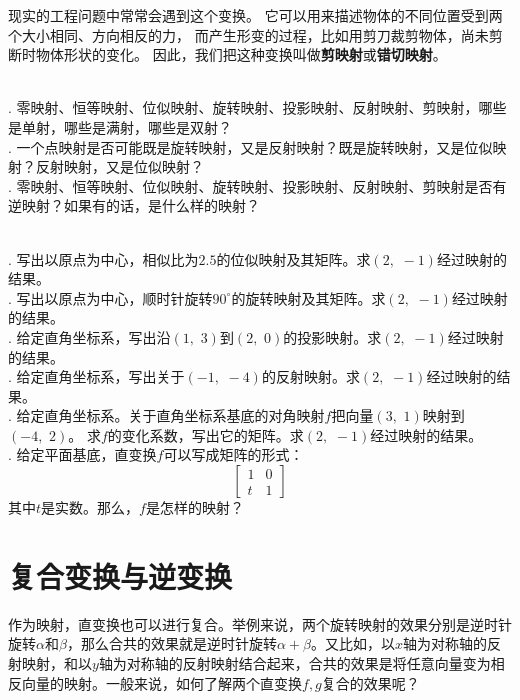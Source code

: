 \documentclass[12pt,UTF8,fontset=none]{ctexbook}
\begin{document}
现实的工程问题中常常会遇到这个变换。
它可以用来描述物体的不同位置受到两个大小相同、方向相反的力，
而产生形变的过程，比如用剪刀裁剪物体，尚未剪断时物体形状的变化。
因此，我们把这种变换叫做\textbf{剪映射}或\textbf{错切映射}。


\begin{sk}
    \mbox{} \\
    . 零映射、恒等映射、位似映射、旋转映射、投影映射、反射映射、剪映射，哪些是单射，哪些是满射，哪些是双射？\\
    . 一个点映射是否可能既是旋转映射，又是反射映射？既是旋转映射，又是位似映射？反射映射，又是位似映射？\\
    . 零映射、恒等映射、位似映射、旋转映射、投影映射、反射映射、剪映射是否有逆映射？如果有的话，是什么样的映射？
\end{sk}

\begin{xt}
    \mbox{} \\
    . 写出以原点为中心，相似比为$2.5$的位似映射及其矩阵。求$(2,\,\,-1)$经过映射的结果。\\
    . 写出以原点为中心，顺时针旋转$90^\circ$的旋转映射及其矩阵。求$(2,\,\,-1)$经过映射的结果。\\
    . 给定直角坐标系，写出沿$(1,\,\,3)$到$(2,\,\,0)$的投影映射。求$(2,\,\,-1)$经过映射的结果。\\
    . 给定直角坐标系，写出关于$(-1,\,\,-4)$的反射映射。求$(2,\,\,-1)$经过映射的结果。\\
    . 给定直角坐标系。关于直角坐标系基底的对角映射$f$把向量$(3,\,\,1)$映射到$(-4,\,\,2)$。
               求$f$的变化系数，写出它的矩阵。求$(2,\,\,-1)$经过映射的结果。\\
    . 给定平面基底，直变换$f$可以写成矩阵的形式：
                $$
                \begin{bmatrix}
                    1 & 0 \\ t & 1
                \end{bmatrix}
                $$
                其中$t$是实数。那么，$f$是怎样的映射？
\end{xt}

\section{复合变换与逆变换}
作为映射，直变换也可以进行复合。举例来说，两个旋转映射的效果分别是逆时针旋转$\alpha$和$\beta$，那么合共的效果就是逆时针旋转$\alpha+\beta$。又比如，以$x$轴为对称轴的反射映射，和以$y$轴为对称轴的反射映射结合起来，合共的效果是将任意向量变为相反向量的映射。一般来说，如何了解两个直变换$f,g$复合的效果呢？
\end{document}
